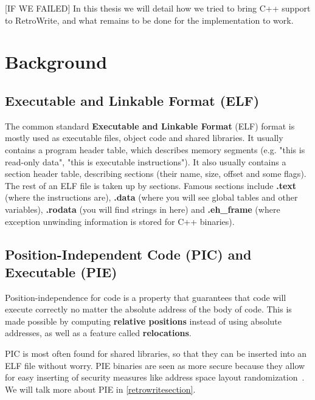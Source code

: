\documentclass[a4paper,11pt,oneside]{report}
\begin{document}
[IF WE FAILED]
In this thesis we will detail how we tried to bring C++ support to RetroWrite, 
and what remains to be done for the implementation to work.


\chapter{Background}



\section{Executable and Linkable Format (ELF)}

The common standard \textbf{Executable and Linkable Format} (ELF) format is 
mostly used as executable files, object code and shared libraries.
It usually contains a program header table, which describes memory segments 
(e.g. "this is read-only data", "this is executable instructions").
It also usually contains a section header table, describing sections (their 
name, size, offset and some flags). 
The rest of an ELF file is taken up by sections.
Famous sections include
\textbf{.text} (where the instructions are),
\textbf{.data} (where you will see global tables and other variables),
\textbf{.rodata} (you will find strings in here)
and \textbf{.eh\_frame} (where exception unwinding information is stored for 
C++ binaries).

\section{Position-Independent Code (PIC) and Executable (PIE)}
\label{picpie}

Position-independence for code is a property that guarantees that code will 
execute correctly no matter the absolute address of the body of code.
This is made possible by computing \textbf{relative positions} instead of
using absolute addresses, as well as a feature called \textbf{relocations}.

PIC is most often found for shared libraries, so that they can be inserted into 
an ELF file without worry.
PIE binaries are seen as more secure because they allow for easy inserting of 
security measures like address space layout 
randomization~\cite{aslr}.
We will talk more about PIE in \autoref{retrowritesection}.
\end{document}
